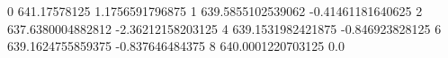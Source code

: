 0 641.17578125 1.1756591796875
1 639.5855102539062 -0.41461181640625
2 637.6380004882812 -2.36212158203125
4 639.1531982421875 -0.846923828125
6 639.1624755859375 -0.837646484375
8 640.0001220703125 0.0
